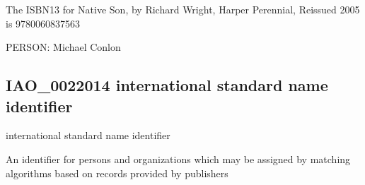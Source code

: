 \documentclass[letterpaper,10pt,english]{sphinxmanual}
\begin{document}
\begin{sphinxShadowBox}

\sphinxAtStartPar
The ISBN\sphinxhyphen{}13 for Native Son, by Richard Wright, Harper Perennial, Reissued 2005 is 978\sphinxhyphen{}0\sphinxhyphen{}06\sphinxhyphen{}083756\sphinxhyphen{}3
\end{sphinxShadowBox}

\begin{sphinxShadowBox}

\sphinxAtStartPar
{}
\end{sphinxShadowBox}

\begin{sphinxShadowBox}

\sphinxAtStartPar
PERSON: Michael Conlon
\end{sphinxShadowBox}
\begin{quote}

\ignorespaces \end{quote}


\subsection{IAO\_0022014 \sphinxhyphen{} international standard name identifier}
\label{\detokenize{doc-IAO_0022014:iao-0022014-international-standard-name-identifier}}\label{\detokenize{doc-IAO_0022014:index-0}}\label{\detokenize{doc-IAO_0022014::doc}}
\begin{sphinxShadowBox}

\sphinxAtStartPar
international standard name identifier
\end{sphinxShadowBox}

\begin{sphinxShadowBox}

\sphinxAtStartPar
An identifier for persons and organizations which may be assigned by matching algorithms based on records provided by publishers
\end{sphinxShadowBox}

\begin{sphinxShadowBox}

\sphinxAtStartPar
{}
\end{sphinxShadowBox}
\end{document}
